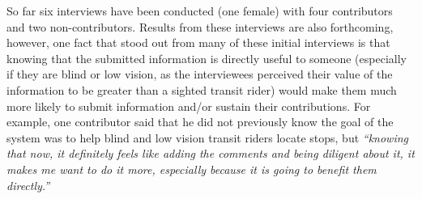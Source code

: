 So far six interviews have been conducted (one female) with four contributors and two non-contributors. Results from these interviews are also forthcoming, however, one fact that stood out from many of these initial interviews is that knowing that the submitted information is directly useful to someone (especially if they are blind or low vision, as the interviewees perceived their value of the information to be greater than a sighted transit rider) would make them much more likely to submit information and/or sustain their contributions. For example, one contributor said that he did not previously know the goal of the system was to help blind and low vision transit riders locate stops, but \textit{``knowing that now, it definitely feels like adding the comments and being diligent about it, it makes me want to do it more, especially because it is going to benefit them directly.''}




